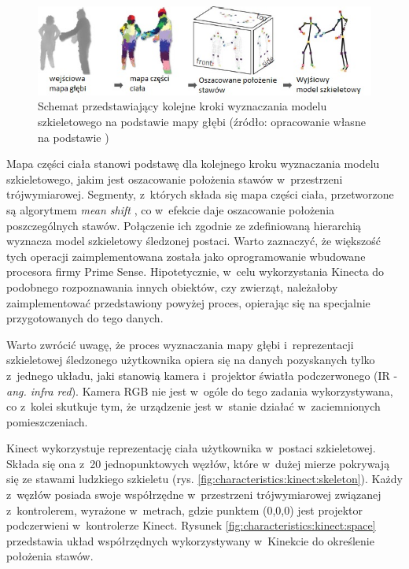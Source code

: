 \begin{savenotes}
	\begin{figure}[!htb]
		\centering	
		\includegraphics[width=\textwidth]{images/KinectRecognitionSteps.jpg}
		\caption{Schemat przedstawiający kolejne kroki wyznaczania modelu szkieletowego na podstawie mapy głębi (źródło: opracowanie własne na podstawie \cite{MacCormick2011})}
		\label{fig:literature:kinect:classificationSteps}
	\end{figure}
\end{savenotes}
																									
Mapa części ciała stanowi podstawę dla kolejnego kroku wyznaczania modelu szkieletowego, jakim jest oszacowanie położenia stawów w~przestrzeni trójwymiarowej. Segmenty, z~których składa się mapa części ciała, przetworzone są algorytmem \emph{mean shift} \cite{Comaniciu2003}, co w~efekcie daje oszacowanie położenia poszczególnych stawów. Połączenie ich zgodnie ze zdefiniowaną hierarchią wyznacza model szkieletowy śledzonej postaci. Warto zaznaczyć, że większość tych operacji zaimplementowana została jako oprogramowanie wbudowane procesora firmy Prime Sense. Hipotetycznie, w~celu wykorzystania Kinecta do podobnego rozpoznawania innych obiektów, czy zwierząt, należałoby zaimplementować przedstawiony powyżej proces, opierając się na specjalnie przygotowanych do tego danych.

Warto zwrócić uwagę, że proces wyznaczania mapy głębi i~reprezentacji szkieletowej śledzonego użytkownika opiera się na danych pozyskanych tylko z~jednego układu, jaki stanowią kamera i~projektor światła podczerwonego (IR - \emph{ang. infra red}). Kamera RGB nie jest w~ogóle do tego zadania wykorzystywana, co z~kolei skutkuje tym, że urządzenie jest w~stanie działać w~zaciemnionych pomieszczeniach.
																									
Kinect wykorzystuje reprezentację ciała użytkownika w~postaci szkieletowej. Składa się ona z~20 jednopunktowych węzłów, które w~dużej mierze pokrywają się ze stawami ludzkiego szkieletu (rys. \ref{fig:characteristics:kinect:skeleton}). Każdy z~węzłów posiada swoje współrzędne w~przestrzeni trójwymiarowej związanej z~kontrolerem, wyrażone w~metrach, gdzie punktem (0,0,0) jest projektor podczerwieni w~kontrolerze Kinect. Rysunek \ref{fig:characteristics:kinect:space} przedstawia układ współrzędnych wykorzystywany w~Kinekcie do określenie położenia stawów. 
																									
